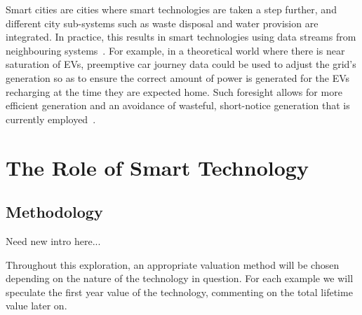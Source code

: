 \documentclass[conference]{IEEEtran}
\begin{document}
Smart cities are cities where smart technologies are taken a step
further, and different city sub-systems such as waste disposal and
water provision are integrated. In practice, this results in smart
technologies using data streams from neighbouring
systems~\cite{shapiro:2006}. For example, in a theoretical world where
there is near saturation of EVs, preemptive car journey data could be
used to adjust the grid’s generation so as to ensure the correct
amount of power is generated for the EVs recharging at the time they
are expected home. Such foresight allows for more efficient generation
and an avoidance of wasteful, short-notice generation that is
currently employed~\cite{tsoukalas:2008}.

\section{The Role of Smart Technology}

\subsection{Methodology}



Need new intro here...



Throughout this exploration, an appropriate valuation method will be
chosen depending on the nature of the technology in question. For each
example we will speculate the first year value of the technology,
commenting on the total lifetime value later on.
\end{document}
